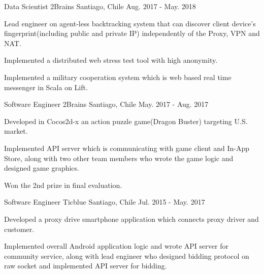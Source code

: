 \begin{cventries}
  \cventry
    {Data Scientist} %
    {2Brains} %
    {Santiago, Chile} %
    {Aug. 2017 - May. 2018} %
    {
      \begin{cvitems} %
        \item {Lead engineer on agent-less backtracking system that can discover client device's fingerprint(including public and private IP) independently of the Proxy, VPN and NAT.}
        \item {Implemented a distributed web stress test tool with high anonymity.}
        \item {Implemented a military cooperation system which is web based real time messenger in Scala on Lift.}
      \end{cvitems}
    }

  \cventry
    {Software Engineer} %
    {2Brains} %
    {Santiago, Chile} %
    {May. 2017 - Aug. 2017} %
    {
      \begin{cvitems} %
        \item {Developed in Cocos2d-x an action puzzle game(Dragon Buster) targeting U.S. market.}
        \item {Implemented API server which is communicating with game client and In-App Store, along with two other team members who wrote the game logic and designed game graphics.}
        \item {Won the 2nd prize in final evaluation.}
      \end{cvitems}
    }

  \cventry
    {Software Engineer} %
    {Ticblue} %
    {Santiago, Chile} %
    {Jul. 2015 - May. 2017} %
    {
      \begin{cvitems} %
        \item {Developed a proxy drive smartphone application which connects proxy driver and customer.}
        \item {Implemented overall Android application logic and wrote API server for community service, along with lead engineer who designed bidding protocol on raw socket and implemented API server for bidding.}
      \end{cvitems}
    }


\end{cventries}
